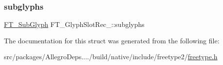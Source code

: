 \mbox{\label{struct_f_t___glyph_slot_rec___a295f5a3108399c4c0703e6ee2f88cc67}} 
\subsubsection{\texorpdfstring{subglyphs}{subglyphs}}
{\footnotesize\ttfamily \hyperlink{freetype_8h_a0d03ab6cac878c81dca92e6a8c87a3a1}{F\+T\+\_\+\+Sub\+Glyph} F\+T\+\_\+\+Glyph\+Slot\+Rec\+\_\+\+::subglyphs}



The documentation for this struct was generated from the following file\+:\begin{DoxyCompactItemize}
\item 
src/packages/\+Allegro\+Deps..../build/native/include/freetype2/\hyperlink{freetype_8h}{freetype.\+h}\end{DoxyCompactItemize}

